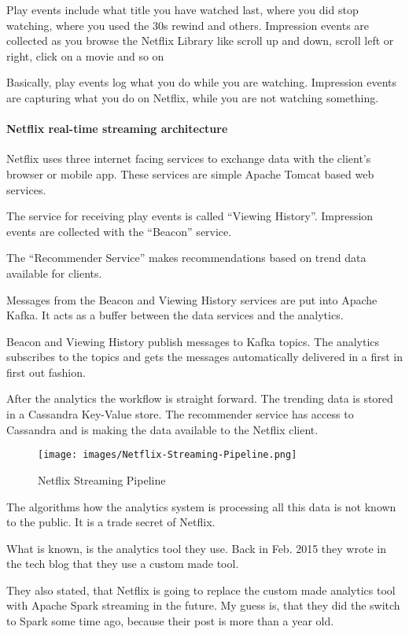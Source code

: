 \documentclass[12pt, numbers=noenddot]{scrreprt} %
\begin{document}
Play events include what title you have watched last, where you did stop watching, where you used the 30s rewind and others.
Impression events are collected as you browse the Netflix Library like scroll up and down, scroll left or right, click on a movie and so on

Basically, play events log what you do while you are watching. Impression events are capturing what you do on Netflix, while you are not watching something.

\paragraph{Netflix real-time streaming architecture}
Netflix uses three internet facing services to exchange data with the client’s browser or mobile app. These services are simple Apache Tomcat based web services.

The service for receiving play events is called “Viewing History”. Impression events are collected with the “Beacon” service.

The “Recommender Service” makes recommendations based on trend data available for clients.

Messages from the Beacon and Viewing History services are put into Apache Kafka.
It acts as a buffer between the data services and the analytics.

Beacon and Viewing History publish messages to Kafka topics. The analytics subscribes to the topics and gets the messages automatically delivered in a first in first out fashion.

After the analytics the workflow is straight forward. The trending data is stored in a Cassandra Key-Value store. The recommender service has access to Cassandra and is making the data available to the Netflix client.

\begin{figure}[htbp]
  \centering
     \texttt{[image: images/Netflix-Streaming-Pipeline.png]}
  \caption{Netflix Streaming Pipeline}
  \label{fig:Bild1}
\end{figure}


The algorithms how the analytics system is processing all this data is not known to the public. It is a trade secret of Netflix.

What is known, is the analytics tool they use. Back in Feb. 2015 they wrote in the tech blog that they use a custom made tool.

They also stated, that Netflix is going to replace the custom made analytics tool with Apache Spark streaming in the future. My guess is, that they did the switch to Spark some time ago, because their post is more than a year old.
\end{document}
